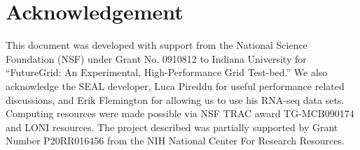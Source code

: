 \documentclass{sig-alternate}
\begin{document}
\section*{Acknowledgement}
This document was developed with support from the National Science
Foundation (NSF) under Grant No.  0910812 to Indiana University for
``FutureGrid: An Experimental, High-Performance Grid Test-bed.''  We
also acknowledge the SEAL developer, Luca Pireddu for useful performance related
discussions, and Erik Flemington for allowing us to use his RNA-seq data sets. Computing resources were made possible via NSF TRAC award TG-MCB090174 and LONI resources.  The project described was partially
supported by Grant Number P20RR016456 from the NIH National Center For
Research Resources.

 

\end{document}
